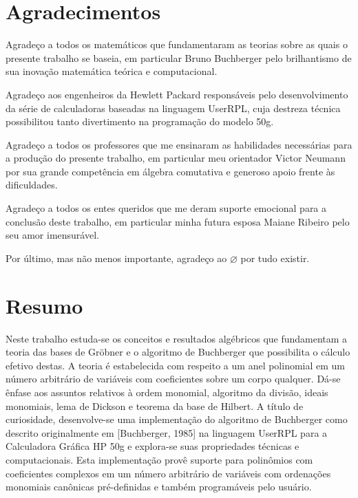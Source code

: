 \documentclass[12pt,a4paper]{report}
\numberwithin{theorem}{chapter}
\begin{document}
\thispagestyle{empty}



\newpage

\chapter*{Agradecimentos}

\noindent

Agradeço a todos os matemáticos que fundamentaram as teorias sobre as
quais o presente trabalho se baseia, em particular Bruno Buchberger
pelo brilhantismo de sua inovação matemática teórica e computacional.

Agradeço aos engenheiros da Hewlett Packard responsáveis pelo
desenvolvimento da série de calculadoras baseadas na linguagem
UserRPL, cuja destreza técnica possibilitou tanto divertimento na
programação do modelo 50g.

Agradeço a todos os professores que me ensinaram as habilidades
necessárias para a produção do presente trabalho, em particular meu
orientador Victor Neumann por sua grande competência em álgebra
comutativa e generoso apoio frente às dificuldades.

Agradeço a todos os entes queridos que me deram suporte emocional para
a conclusão deste trabalho, em particular minha futura esposa Maiane
Ribeiro pelo seu amor imensurável.

Por último, mas não menos importante, agradeço ao \(\varnothing\) por
tudo existir.

\thispagestyle{empty}



\newpage

\chapter*{Resumo}

Neste trabalho estuda-se os conceitos e resultados algébricos que
fundamentam a teoria das bases de Gröbner e o algoritmo de Buchberger
que possibilita o cálculo efetivo destas.  A teoria é estabelecida com
respeito a um anel polinomial em um número arbitrário de variáveis com
coeficientes sobre um corpo qualquer.  Dá-se ênfase aos assuntos
relativos à ordem monomial, algoritmo da divisão, ideais monomiais,
lema de Dickson e teorema da base de Hilbert.  A título de
curiosidade, desenvolve-se uma implementação do algoritmo de
Buchberger como descrito originalmente em [Buchberger, 1985] na
linguagem UserRPL para a Calculadora Gráfica HP 50g e explora-se suas
propriedades técnicas e computacionais.  Esta implementação provê
suporte para polinômios com coeficientes complexos em um número
arbitrário de variáveis com ordenações monomiais canônicas
pré-definidas e também programáveis pelo usuário.
\end{document}
